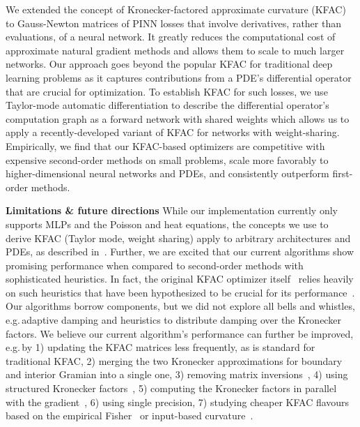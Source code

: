 We extended the concept of Kronecker-factored approximate curvature (KFAC) to Gauss-Newton matrices of PINN losses that involve derivatives, rather than evaluations, of a neural network.
It greatly reduces the computational cost of approximate natural gradient methods and allows them to scale to much larger networks.
Our approach goes beyond the popular KFAC for traditional deep learning problems as it captures contributions from a PDE's differential operator that are crucial for optimization.
To establish KFAC for such losses, we use Taylor-mode automatic differentiation to describe the differential operator's computation graph as a forward network with shared weights which allows us to apply a recently-developed variant of KFAC for networks with weight-sharing.
Empirically, we find that our KFAC-based optimizers are competitive with expensive second-order methods on small problems, scale more favorably to higher-dimensional neural networks and PDEs, and consistently outperform first-order methods.

\textbf{Limitations \& future directions} While our implementation currently only supports MLPs and the Poisson and heat equations, the concepts we use to derive KFAC (Taylor mode, weight sharing) apply to arbitrary architectures and PDEs, as described in~.
Further, we are excited that our current algorithms show promising performance when compared to second-order methods with sophisticated heuristics.
In fact, the original KFAC optimizer itself~\cite{martens2015optimizing} relies heavily on such heuristics that have been hypothesized to be crucial for its performance~\cite{clarke2023adam}.
Our algorithms borrow components, but we did not explore all bells and whistles, e.g.\,adaptive damping and heuristics to distribute damping over the Kronecker factors.
We believe our current algorithm's performance can further be improved, e.g.\,by 1) updating the KFAC matrices less frequently, as is standard for traditional KFAC, 2) merging the two Kronecker approximations for boundary and interior Gramian into a single one, 3) removing matrix inversions~\cite{lin2023simplifying}, 4) using structured Kronecker factors~\cite{lin2023structured}, 5) computing the Kronecker factors in parallel with the gradient~\cite{dangel2020backpack}, 6) using single precision, 7) studying cheaper KFAC flavours based on the empirical Fisher~\cite{kunstner2019limitations} or input-based curvature~\cite{benzing2022gradient,petersen2023isaac}.